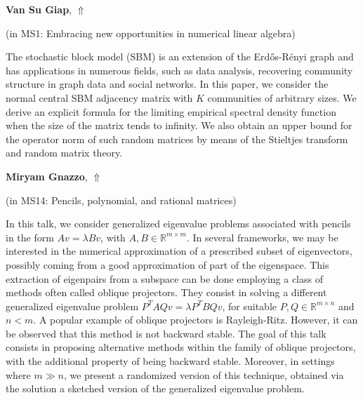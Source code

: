 \documentclass[ILAS2025-program.tex]{subfiles}
\begin{document}
\hypertarget{down0272}{}\begin{ilasabstract}
    
\textbf{Van Su Giap},  \hfill \hyperlink{up0272}{$\Uparrow$}
    
    
(in {\color{mstitle}MS1: Embracing new opportunities in numerical linear algebra})
        
\mtskip
    The stochastic block model (SBM) is an extension of the Erd\H{o}s-R\'{e}nyi graph and has applications in numerous fields, such as data analysis, recovering community structure in graph data and social networks. In this paper, we consider the normal central SBM adjacency matrix with $K$ communities of arbitrary sizes. We derive an explicit formula for the limiting empirical spectral density function when the size of the matrix tends to infinity. We also obtain an upper bound for the operator norm of such random matrices by means of the Stieltjes transform and random matrix theory.

\end{ilasabstract}
    

\hypertarget{down0373}{}\begin{ilasabstract}
    
\textbf{Miryam Gnazzo},  \hfill \hyperlink{up0373}{$\Uparrow$}
    
    
(in {\color{mstitle}MS14: Pencils, polynomial, and rational matrices})
        
\mtskip
    In this talk, we consider generalized eigenvalue problems associated with pencils in the form $A v = \lambda B v$, with $A,B \in \mathbb{R}^{m \times m}$. In several frameworks, we may be interested in the numerical approximation of a prescribed subset of eigenvectors, possibly coming from a good approximation of part of the eigenspace. This extraction of eigenpairs from a subspace can be done employing a class of methods often called oblique projectors. They consist in solving a different generalized eigenvalue problem $P^TAQv = \lambda P^T B Qv$, for suitable $P,Q\in \mathbb{R}^{m \times n}$ and $n<m$. A popular example of oblique projectors is Rayleigh-Ritz. However, it can be observed that this method is not backward stable. The goal of this talk consists in proposing alternative methods within the family of oblique projectors, with the additional property of being backward stable. Moreover, in settings where $m \gg n$, we present a randomized version of this technique, obtained via the solution a sketched version of the generalized eigenvalue problem.

\end{ilasabstract}
    
\end{document}
